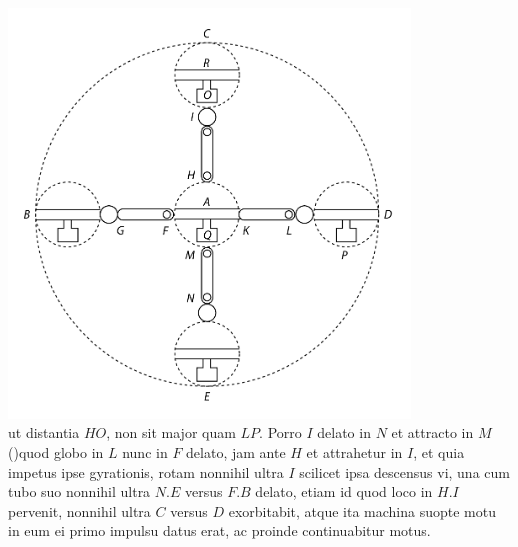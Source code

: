\pend
\vspace{1em}
\pstart
\centering\includegraphics[trim = 0mm 3mm 0mm 0mm, clip, width=0.8\textwidth]{images/LH03705_059r-d.pdf}\\
\noindent {} 
\pend
\count{}
\newpage
\pstart \noindent ut distantia $HO$, non sit major quam $LP.$   Porro $I$ delato in $N$ et attracto in $M$ (\phantom)\hspace{-1.2mm}quod globo in $L$ nunc in $F$ delato,
jam ante
%
{}
$H$ et attrahetur in $I$,
et quia impetus \protect{} ipse gyrationis\protect{},
rotam nonnihil ultra
$I$ scilicet ipsa descensus vi,\protect{}
una cum tubo suo nonnihil ultra $N.E$ versus $F.B$ delato,
etiam id quod
 loco in $H.I$ pervenit, nonnihil ultra $C$ versus $D$ exorbitabit, atque ita machina suopte motu in eum  ei primo  impulsu \protect{} datus erat, ac proinde continuabitur motus. 
